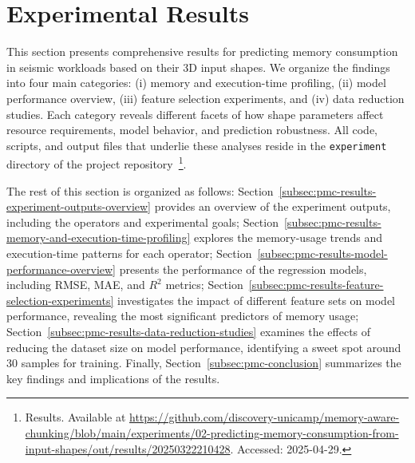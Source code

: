 \section{Experimental Results}
\label{sec:pmc-results}

This section presents comprehensive results for predicting memory consumption in seismic workloads based on their \ac{3D} input shapes.
We organize the findings into four main categories:
(i) memory and execution-time profiling,
(ii) model performance overview,
(iii) feature selection experiments,
and (iv) data reduction studies.
Each category reveals different facets of how shape parameters affect resource requirements, model behavior, and prediction robustness.
All code, scripts, and output files that underlie these analyses reside in the \texttt{experiment} directory of the project repository~\footnote{Results. Available at \url{https://github.com/discovery-unicamp/memory-aware-chunking/blob/main/experiments/02-predicting-memory-consumption-from-input-shapes/out/results/20250322210428}. Accessed: 2025-04-29.}.

The rest of this section is organized as follows:
Section~\ref{subsec:pmc-results-experiment-outputs-overview} provides an overview of the experiment outputs, including the operators and experimental goals;
Section~\ref{subsec:pmc-results-memory-and-execution-time-profiling} explores the memory-usage trends and execution-time patterns for each operator;
Section~\ref{subsec:pmc-results-model-performance-overview} presents the performance of the regression models, including \ac{RMSE}, \ac{MAE}, and $R^2$ metrics;
Section~\ref{subsec:pmc-results-feature-selection-experiments} investigates the impact of different feature sets on model performance, revealing the most significant predictors of memory usage;
Section~\ref{subsec:pmc-results-data-reduction-studies} examines the effects of reducing the dataset size on model performance, identifying a sweet spot around 30 samples for training.
Finally, Section~\ref{subsec:pmc-conclusion} summarizes the key findings and implications of the results.





